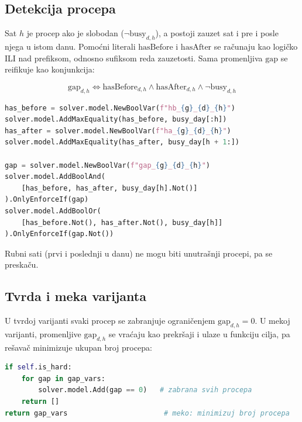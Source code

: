\documentclass[12pt,oneside]{memoir}
\begin{document}
\subsection{Detekcija procepa}

Sat $h$ je procep ako je slobodan ($\neg \text{busy}_{d,h}$), a postoji
zauzet sat i pre i posle njega u istom danu. Pomoćni literali
$\text{hasBefore}$ i $\text{hasAfter}$ se računaju kao logičko ILI nad
prefiksom, odnosno sufiksom reda zauzetosti. Sama promenljiva
$\text{gap}$ se reifikuje kao konjunkcija:

\begin{equation}
\text{gap}_{d,h} \Leftrightarrow
\text{hasBefore}_{d,h} \land \text{hasAfter}_{d,h} \land
\neg \text{busy}_{d,h}
\end{equation}

\begin{english}
\begin{lstlisting}[language=Python, caption={Detekcija unutrašnjeg procepa}]
has_before = solver.model.NewBoolVar(f"hb_{g}_{d}_{h}")
solver.model.AddMaxEquality(has_before, busy_day[:h])
has_after = solver.model.NewBoolVar(f"ha_{g}_{d}_{h}")
solver.model.AddMaxEquality(has_after, busy_day[h + 1:])

gap = solver.model.NewBoolVar(f"gap_{g}_{d}_{h}")
solver.model.AddBoolAnd(
    [has_before, has_after, busy_day[h].Not()]
).OnlyEnforceIf(gap)
solver.model.AddBoolOr(
    [has_before.Not(), has_after.Not(), busy_day[h]]
).OnlyEnforceIf(gap.Not())
\end{lstlisting}
\end{english}

Rubni sati (prvi i poslednji u danu) ne mogu biti unutrašnji procepi,
pa se preskaču.

\subsection{Tvrda i meka varijanta}

U tvrdoj varijanti svaki procep se zabranjuje ograničenjem
$\text{gap}_{d,h} = 0$. U mekoj varijanti, promenljive $\text{gap}_{d,h}$
se vraćaju kao prekršaji i ulaze u funkciju cilja, pa rešavač
minimizuje ukupan broj procepa:

\begin{english}
\begin{lstlisting}[language=Python, caption={Tvrda naspram meke varijante}]
if self.is_hard:
    for gap in gap_vars:
        solver.model.Add(gap == 0)   # zabrana svih procepa
    return []
return gap_vars                       # meko: minimizuj broj procepa
\end{lstlisting}
\end{english}
\end{document}

